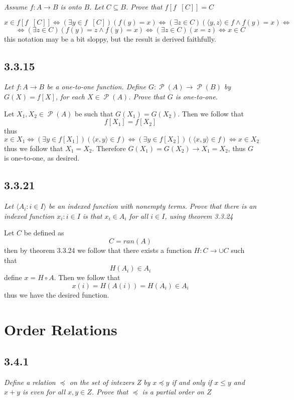\documentclass[11pt,oneside,titlepage]{book}
\DeclareMathOperator \pow {\mathcal {P}}
\DeclareMathOperator \inv {^{-1}}
\DeclareMathOperator \lra {\Leftrightarrow}
\newcommand{\eangle}[1]{\langle #1 \rangle}
\begin{document}
\textit{Assume $f: A \to B$ is onto $B$. Let $C \subseteq B$. Prove that $f[f\inv[C]] = C$}

$$x \in f[f\inv[C]] \lra (\exists y \in f\inv[C])(f(y) = x) \lra
(\exists z \in C)(\eangle{y, z} \in f \land f(y) = x) \lra$$
$$ \lra (\exists z \in C)(f(y) = z \land f(y) = x) \lra (\exists z \in C)(x = z) \lra x \in C$$
this notation may be a bit sloppy, but the result is derived faithfully.

\subsection*{3.3.15}

\textit{Let $f: A \to B$ be a one-to-one function. Define $G: \pow(A) \to \pow(B)$ by
  $G(X) = f[X]$, for each $X \in \pow(A)$. Prove that $G$ is one-to-one.}

Let $X_1, X_2 \in \pow(A)$ be such that $G(X_1) = G(X_2)$. Then we follow that
$$f[X_1] = f[X_2]$$
thus
$$x \in X_1 \lra (\exists y \in f[X_1])(\eangle{x, y} \in f) \lra
(\exists y \in f[X_2])(\eangle{x, y} \in f) \lra x \in X_2$$
thus we follow that $X_1 = X_2$. Therefore $G(X_1) = G(X_2) \to X_1 = X_2$, thus $G$ is
one-to-one, as desired.

\subsection*{3.3.21}

\textit{Let $\eangle{A_i: i \in I}$ be an indexed function with nonempty terms. Prove that there
  is an indexed function ${x_i: i \in I}$ is that $x_i \in A_i$ for all $i \in I$, using
  theorem 3.3.24}

Let $C$ be defined as
$$C = ran(A)$$
then by theorem 3.3.24 we follow that there exists a function $H: C \to \cup C$ such that
$$H(A_i) \in A_i$$
define $x = H \circ A $. Then we follow that
$$x(i) = H(A(i)) = H(A_i) \in A_i$$
thus we have the desired function.

\section{Order Relations}

\subsection*{3.4.1}

\textit{Define a relation $\preceq$ on the set of intezers Z by $x \preceq y$ if and only if
  $x \leq y$ and $x + y$ is even for all $x, y \in Z$. Prove that $\preceq$ is a partial order
  on $Z$}
\end{document}
